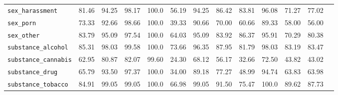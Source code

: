 \begin{table}[h!]
{\begin{tabular}{l|c|ccccccccccc}
\midrule

\texttt{sex\_harassment}&\colorbox{Red!30}{81.46}  & \colorbox{Orange!50}{94.25} & \colorbox{Orange!50}{98.17} & \colorbox{Sand!20}{100.0} & \colorbox{Red!30}{56.19} & \colorbox{Orange!50}{94.25} & \colorbox{Red!30}{86.42} & \colorbox{Red!30}{83.81} & \colorbox{Orange!50}{96.08} & \colorbox{Red!30}{71.27} & \colorbox{Red!30}{77.02}\\

\texttt{sex\_porn}&\colorbox{Red!30}{73.33}  & \colorbox{Orange!50}{92.66} & \colorbox{Orange!50}{98.66} & \colorbox{Sand!20}{100.0} & \colorbox{Red!30}{39.33} & \colorbox{Orange!50}{90.66} & \colorbox{Red!30}{70.00} & \colorbox{Red!30}{60.66} & \colorbox{Red!30}{89.33} & \colorbox{Red!30}{58.00} & \colorbox{Red!30}{56.00}\\

\texttt{sex\_other} &\colorbox{Red!30}{83.79} & \colorbox{Orange!50}{95.09} & \colorbox{Orange!50}{97.54} & \colorbox{Sand!20}{100.0} & \colorbox{Red!30}{64.03} & \colorbox{Orange!50}{95.09} & \colorbox{Red!30}{83.92} & \colorbox{Red!30}{86.37} & \colorbox{Orange!50}{95.91} & \colorbox{Red!30}{70.29} & \colorbox{Red!30}{80.38}\\

\midrule
\texttt{substance\_alcohol} &\colorbox{Red!30}{85.31} & \colorbox{Orange!50}{98.03} & \colorbox{Sand!20}{99.58} & \colorbox{Sand!20}{100.0} & \colorbox{Red!30}{73.66} & \colorbox{Orange!50}{96.35} & \colorbox{Red!30}{87.95} & \colorbox{Red!30}{81.79} & \colorbox{Orange!50}{98.03} & \colorbox{Red!30}{83.19} & \colorbox{Red!30}{83.47}\\

\texttt{substance\_cannabis} &\colorbox{Red!30}{62.95} & \colorbox{Red!30}{80.87} & \colorbox{Red!30}{82.07} & \colorbox{Sand!20}{99.60} & \colorbox{Red!30}{24.30} & \colorbox{Red!30}{68.12} & \colorbox{Red!30}{56.17} & \colorbox{Red!30}{32.66} & \colorbox{Red!30}{72.50} & \colorbox{Red!30}{43.82} & \colorbox{Red!30}{43.02}\\

\texttt{substance\_drug} &\colorbox{Red!30}{65.79} & \colorbox{Orange!50}{93.50} & \colorbox{Orange!50}{97.37} & \colorbox{Sand!20}{100.0} & \colorbox{Red!30}{34.00} & \colorbox{Red!30}{89.18} & \colorbox{Red!30}{77.27} & \colorbox{Red!30}{48.99} & \colorbox{Orange!50}{94.74} & \colorbox{Red!30}{63.83} & \colorbox{Red!30}{63.98}\\

\texttt{substance\_tobacco} &\colorbox{Red!30}{84.91} & \colorbox{Sand!20}{99.05} & \colorbox{Sand!20}{99.05} & \colorbox{Sand!20}{100.0} & \colorbox{Red!30}{66.98} & \colorbox{Sand!20}{99.05} & \colorbox{Orange!50}{91.50} & \colorbox{Red!30}{75.47} & \colorbox{Sand!20}{100.0} & \colorbox{Red!30}{89.62} & \colorbox{Red!30}{87.73}\\


\end{tabular}}
\end{table}
